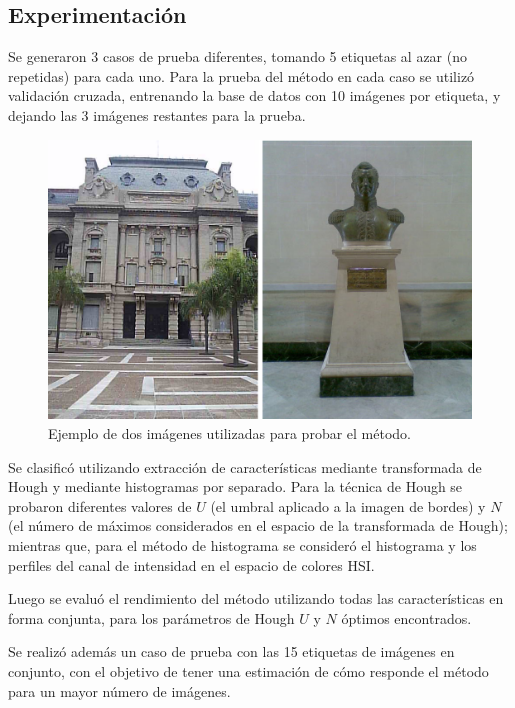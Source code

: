 \documentclass[conference,a4paper,10pt,oneside,final]{tfmpd}
\begin{document}
\subsection{Experimentación}
Se generaron 3 {casos} de prueba diferentes, tomando
5 etiquetas al azar (no repetidas) para cada {uno}.
Para la prueba del método {en cada caso}
se utilizó validación cruzada,
entrenando la base de datos con 10 imágenes por etiqueta, y dejando las 3
imágenes restantes para la prueba.

\begin{figure}
\begin{center}
\includegraphics[scale=0.25]{../diagramas/dibujo}
\end{center}
\caption{Ejemplo de dos imágenes utilizadas para probar el método.}
\label{imagenes}
\end{figure}

Se clasificó utilizando extracción de características mediante
transformada de Hough y mediante histogramas por separado.
Para la técnica de Hough se probaron diferentes valores de $U$ (el umbral
aplicado a la imagen de bordes) y $N$ (el número de máximos considerados
en el espacio de la transformada de Hough); mientras que,
para el método de histograma se consideró el histograma y los perfiles
del canal de intensidad en el espacio de colores HSI.

Luego se evaluó el rendimiento del método utilizando todas las características
en forma conjunta, para los parámetros de Hough $U$ y $N$ óptimos encontrados.

Se realizó además un {caso de prueba} con las 15 etiquetas de
imágenes en conjunto, con el objetivo de tener una estimación de cómo responde
el método para un mayor número de imágenes.
\end{document}
